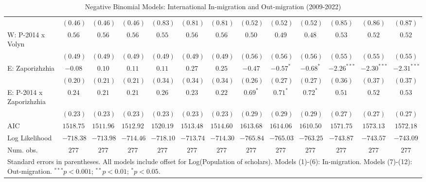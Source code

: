 \begin{table}
\begin{center}
\begin{tiny}
\begin{tabular}{l c c c c c c c c c c c c}
                            & $(0.46)$      & $(0.46)$      & $(0.46)$      & $(0.83)$     & $(0.81)$     & $(0.81)$     & $(0.52)$      & $(0.52)$      & $(0.52)$       & $(0.85)$      & $(0.86)$      & $(0.87)$      \\
W: P-2014 x Volyn           & $0.56$        & $0.56$        & $0.56$        & $0.55$       & $0.56$       & $0.56$       & $0.50$        & $0.49$        & $0.48$         & $0.53$        & $0.52$        & $0.52$        \\
                            & $(0.49)$      & $(0.49)$      & $(0.49)$      & $(0.49)$     & $(0.49)$     & $(0.49)$     & $(0.56)$      & $(0.56)$      & $(0.56)$       & $(0.55)$      & $(0.55)$      & $(0.55)$      \\
E: Zaporizhzhia             & $-0.08$       & $0.10$        & $0.11$        & $0.11$       & $0.27$       & $0.25$       & $-0.47$       & $-0.57^{*}$   & $-0.68^{*}$    & $-2.26^{***}$ & $-2.30^{***}$ & $-2.31^{***}$ \\
                            & $(0.20)$      & $(0.21)$      & $(0.21)$      & $(0.34)$     & $(0.34)$     & $(0.34)$     & $(0.26)$      & $(0.27)$      & $(0.27)$       & $(0.36)$      & $(0.37)$      & $(0.37)$      \\
E: P-2014 x Zaporizhzhia    & $0.24$        & $0.21$        & $0.21$        & $0.26$       & $0.23$       & $0.22$       & $0.69^{*}$    & $0.71^{*}$    & $0.72^{*}$     & $0.51$        & $0.52$        & $0.53$        \\
                            & $(0.23)$      & $(0.23)$      & $(0.23)$      & $(0.23)$     & $(0.23)$     & $(0.23)$     & $(0.29)$      & $(0.29)$      & $(0.29)$       & $(0.27)$      & $(0.27)$      & $(0.27)$      \\
\hline
AIC                         & $1518.75$     & $1511.96$     & $1512.92$     & $1520.19$    & $1513.48$    & $1514.60$    & $1613.68$     & $1614.06$     & $1610.50$      & $1571.75$     & $1573.13$     & $1572.18$     \\
Log Likelihood              & $-718.38$     & $-713.98$     & $-714.46$     & $-718.10$    & $-713.74$    & $-714.30$    & $-765.84$     & $-765.03$     & $-763.25$      & $-743.87$     & $-743.57$     & $-743.09$     \\
Num. obs.                   & $277$         & $277$         & $277$         & $277$        & $277$        & $277$        & $277$         & $277$         & $277$          & $277$         & $277$         & $277$         \\
\hline
\multicolumn{13}{l}{\tiny{Standard errors in parentheses. All models include offset for Log(Population of scholars). Models (1)-(6): In-migration. Models (7)-(12): Out-migration. $^{***}p<0.001$; $^{**}p<0.01$; $^{*}p<0.05$.}}
\end{tabular}
\end{tiny}
\caption{Negative Binomial Models: International In-migration and Out-migration (2009-2022)}
\label{tab:combined_migration}
\end{center}
\end{table}
